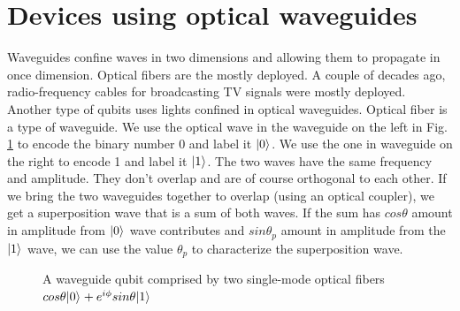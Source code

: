\documentclass[oneside, letter, 12pt]{book}
\begin{document}
\section{Devices using optical waveguides}
Waveguides confine waves in two dimensions and allowing them to propagate in once dimension. Optical fibers are the mostly deployed. A couple of decades ago, radio-frequency cables for broadcasting TV signals were mostly deployed.
Another type of qubits uses lights confined in optical waveguides. Optical fiber is a type of waveguide. We use the optical wave in the waveguide on the left in Fig. \ref{Fiber} to encode the binary number 0 and label it $\vert {0} \rangle_{}$. We use the one in waveguide on the right to encode 1 and label it $\vert {1} \rangle_{}$. The two waves have the same frequency and amplitude. They don't overlap and are of course orthogonal to each other. If we bring the two waveguides together to overlap (using an optical coupler), we get a superposition wave that is a sum of both waves. If the sum has $cos\theta$ amount in amplitude from $\vert {0} \rangle_{}$ wave contributes and $sin\theta_p$ amount in amplitude from the $\vert {1} \rangle_{}$ wave, we can use the value $\theta_p$ to characterize the superposition wave.

\begin{figure}[h]\label{Fiber}
\caption{A waveguide qubit comprised by two single-mode optical fibers $cos{\theta} \vert {0} \rangle_{} + e^{i \phi} sin{\theta} \vert {1} \rangle_{}$}
\end{figure}
\end{document}
